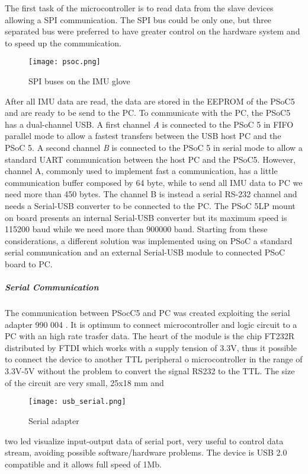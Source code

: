 The first task of the microcontroller is to read data from the slave devices allowing a SPI communication. The SPI bus could be only one, but three separated bus were preferred to have greater control on the hardware system and to speed up the communication.
\begin{figure}[h]
\centering
\texttt{[image: psoc.png]}
\caption{SPI buses on the IMU glove}
\label{fig:spibuses}
\end{figure}

After all IMU data are read, the data are stored in the EEPROM of the PSoC5 and are ready to be send to the PC. To communicate with the PC, the PSoC5 has a dual-channel USB. A first channel \textit{A} %
is connected to the PSoC 5 in FIFO parallel mode to allow a fastest transfers between the USB host PC and the PSoC 5. A second channel \textit{B} is connected to the PSoC 5 in serial mode to allow a standard UART communication between the host PC and the PSoC5. However, channel A, commonly used to implement fast a communication, has a little communication buffer composed by 64 byte, while to send all IMU data to PC we need more than 450 bytes. The channel B is instead a serial RS-232 channel and needs a Serial-USB converter to be connected to the PC. The PSoC 5LP mount on board presents an internal Serial-USB converter but its maximum speed is 115200 baud while we need more than 900000 baud.
Starting from these considerations, a different solution was implemented using on PSoC a standard serial communication and an external Serial-USB module to connected PSoC board to PC.

\subparagraph{Serial Communication}

The communication between PSocC5 and PC was created exploiting the serial adapter 990 004 \cite{Serial_USB}. It is optimum to connect microcontroller and logic circuit to a PC with an high rate trasfer data. The heart of the module is the chip FT232R distributed by FTDI \cite{FDTI_homepage} which works with a supply tension of 3.3V, thus it possible to connect the device to another TTL peripheral o microcontroller in the range of 3.3V-5V without the problem to convert the signal RS232 to  the TTL. The size of the circuit are very small, 25x18 mm and
\begin{figure}[h]
\centering
\texttt{[image: usb\_serial.png]}
\caption{Serial adapter}
\label{fig:serial_adapter}
\end{figure}
two led visualize input-output data of serial port, very useful to control data stream, avoiding possible software/hardware problems. The device is USB 2.0 compatible and it allows full speed of 1Mb.


